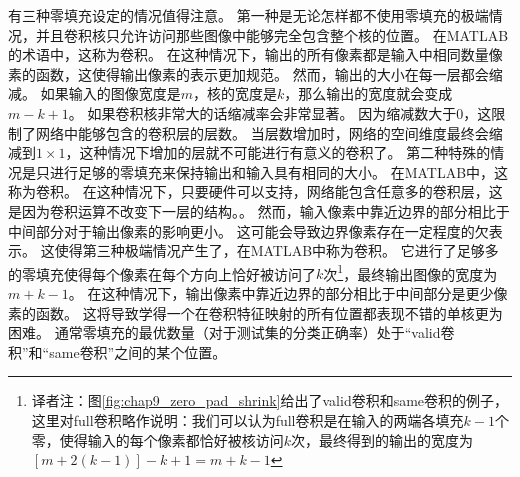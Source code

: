 有三种零填充设定的情况值得注意。
第一种是无论怎样都不使用零填充的极端情况，并且卷积核只允许访问那些图像中能够完全包含整个核的位置。
在MATLAB的术语中，这称为卷积。
在这种情况下，输出的所有像素都是输入中相同数量像素的函数，这使得输出像素的表示更加规范。
然而，输出的大小在每一层都会缩减。
如果输入的图像宽度是$m$，核的宽度是$k$，那么输出的宽度就会变成$m-k+1$。
如果卷积核非常大的话缩减率会非常显著。
因为缩减数大于0，这限制了网络中能够包含的卷积层的层数。
当层数增加时，网络的空间维度最终会缩减到$1\times 1$，这种情况下增加的层就不可能进行有意义的卷积了。
第二种特殊的情况是只进行足够的零填充来保持输出和输入具有相同的大小。
在MATLAB中，这称为卷积。
在这种情况下，只要硬件可以支持，网络能包含任意多的卷积层，这是因为卷积运算不改变下一层的结构。。
然而，输入像素中靠近边界的部分相比于中间部分对于输出像素的影响更小。
这可能会导致边界像素存在一定程度的欠表示。
这使得第三种极端情况产生了，在MATLAB中称为卷积。
它进行了足够多的零填充使得每个像素在每个方向上恰好被访问了$k$次\footnote{译者注：图\ref{fig:chap9_zero_pad_shrink}给出了\gls{valid}卷积和\gls{same}卷积的例子，这里对\gls{full}卷积略作说明：我们可以认为\gls{full}卷积是在输入的两端各填充$k-1$个零，使得输入的每个像素都恰好被核访问$k$次，最终得到的输出的宽度为$[m+2(k-1)]-k+1=m+k-1$}，最终输出图像的宽度为$m+k-1$。%
在这种情况下，输出像素中靠近边界的部分相比于中间部分是更少像素的函数。
这将导致学得一个在卷积特征映射的所有位置都表现不错的单核更为困难。
通常零填充的最优数量（对于测试集的分类正确率）处于``\gls{valid}卷积''和``\gls{same}卷积''之间的某个位置。

 

